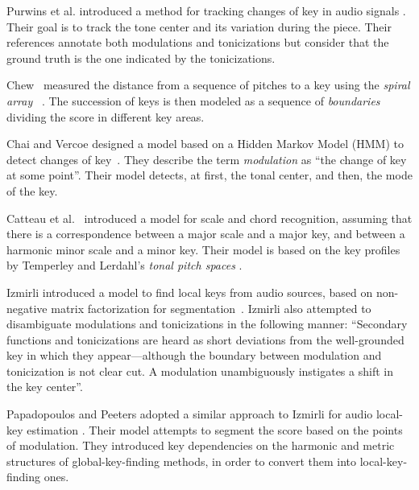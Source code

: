 Purwins et al. introduced a method for tracking changes of key in audio signals %
\cite{purwins_new_2000}.
Their goal is to track the tone center and its variation during the piece. Their references annotate both modulations and tonicizations but consider that the ground truth is the one indicated by the tonicizations.

Chew~\cite{chew2002key} measured the distance from a sequence of pitches to a key using the \emph{spiral array} ~\cite{Chew2000TowardsAM}.
The succession of keys is then modeled as a sequence of \emph{boundaries} dividing the score in different key areas.

Chai and Vercoe designed a model based on a Hidden Markov Model (HMM) to detect changes of key~\cite{chai_detection_2005}.
They describe the term \emph{modulation} as ``the change of key at some point''.
Their model detects, at first, the tonal center, and then, the mode of the key.

Catteau et al.~\cite{Catteau07tonalkey} introduced a model for scale and chord recognition, assuming that there is a correspondence between a major scale and a major key, and between a harmonic minor scale and a minor key. Their model is based on the key profiles by Temperley \cite{Temperley99:tonality} and Lerdahl's \emph{tonal pitch spaces} \cite{lerdahl88tps}.

Izmirli introduced a model to find local keys from audio sources, based on non-negative matrix factorization for segmentation~\cite{izmirli_localized_2007}.
Izmirli also attempted to disambiguate modulations and tonicizations in the following manner: ``Secondary functions and tonicizations are heard as short deviations from the well-grounded key in which they appear---although the boundary between modulation and tonicization is not clear cut. A modulation unambiguously instigates a shift in the key center''.

Papadopoulos and Peeters adopted a similar approach to Izmirli for audio local-key estimation \cite{papadopoulos_local_2009}.
Their model attempts to segment the score based on the points of modulation.
They introduced key dependencies on the harmonic and metric structures of global-key-finding methods, in order to convert them into local-key-finding ones.

